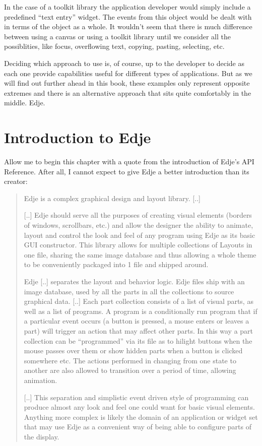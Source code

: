 \documentclass[12pt,a4paper,english]{book}
\begin{document}
In the case of a toolkit library the application developer would simply include
a predefined ``text entry'' widget. The events from this object would be dealt
with in terms of the object as a whole. It wouldn't seem that there is much
difference between using a canvas or using a toolkit library until we consider
all the possiblities, like focus, overflowing text, copying, pasting,
selecting, etc.

Deciding which approach to use is, of course, up to the developer to decide as
each one provide capabilities useful for different types of applications. But
as we will find out further ahead in this book, these examples only represent
opposite extremes and there is an alternative approach that sits quite
comfortably in the middle. Edje.



\hypertarget{introduction-to-edje}{}
\section{Introduction to Edje}
\label{introduction-to-edje}

Allow me to begin this chapter with a quote from the introduction of Edje's API
Reference. After all, I cannot expect to give Edje a better introduction than
its creator:
\begin{quote}

Edje is a complex graphical design and layout library. {[}..{]}

{[}..{]} Edje should serve all the purposes of creating visual elements
(borders of windows, scrollbars, etc.) and allow the designer the ability
to animate, layout and control the look and feel of any program using Edje
as its basic GUI constructor. This library allows for multiple collections
of Layouts in one file, sharing the same image database and thus allowing a
whole theme to be conveniently packaged into 1 file and shipped around.

Edje {[}..{]} separates the layout and behavior logic. Edje files ship with an
image database, used by all the parts in all the collections to source
graphical data. {[}..{]} Each part collection consists of a list of visual
parts, as well as a list of programs. A program is a conditionally run
program that if a particular event occurs (a button is pressed, a mouse
enters or leaves a part) will trigger an action that may affect other
parts. In this way a part collection can be ``programmed'' via its file as to
hilight buttons when the mouse passes over them or show hidden parts when a
button is clicked somewhere etc. The actions performed in changing from one
state to another are also allowed to transition over a period of time,
allowing animation.

{[}..{]} This separation and simplistic event driven style of programming can
produce almost any look and feel one could want for basic visual elements.
Anything more complex is likely the domain of an application or widget set
that may use Edje as a convenient way of being able to configure parts of
the display.
\end{quote}
\end{document}
